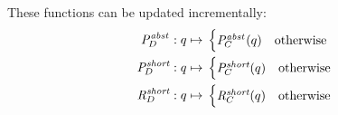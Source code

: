 \documentclass{article}
\begin{document}
%
These functions can be updated incrementally:
%
\begin{align*}
\PastAbs[D] : q \mapsto {}
 & \begin{cases}
 	\PastAbs[C](q) & \text{otherwise}
 \end{cases} \\
\PastShort[D] : q \mapsto {}
 & \begin{cases}
   \PastShort[C](q) & \text{otherwise} \\
   \end{cases} \\
\ReachShort[D] : q \mapsto {}
& \begin{cases}
	\ReachShort[C](q) & \text{otherwise}
\end{cases}
\end{align*}
\end{document}
